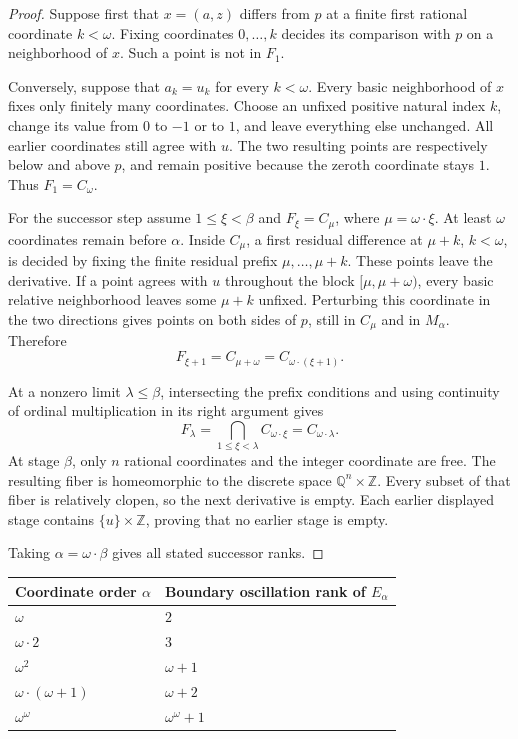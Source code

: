 \documentclass[11pt]{article}
\numberwithin{equation}{section}
\theoremstyle{definition}
\theoremstyle{remark}
\newcommand{\Z}{\mathbb Z}
\newcommand{\Q}{\mathbb Q}
\begin{document}
\begin{proof}
Suppose first that $x=(a,z)$ differs from $p$ at a finite first rational
coordinate $k<\omega$. Fixing coordinates $0,\ldots,k$ decides its
comparison with $p$ on a neighborhood of $x$. Such a point is not in
$F_1$.

Conversely, suppose that $a_k=u_k$ for every $k<\omega$. Every basic
neighborhood of $x$ fixes only finitely many coordinates. Choose an
unfixed positive natural index $k$, change its value from $0$ to $-1$
or to $1$, and leave everything else unchanged. All earlier coordinates
still agree with $u$. The two resulting points are respectively below and
above $p$, and remain positive because the zeroth coordinate stays $1$.
Thus $F_1=C_\omega$.

For the successor step assume $1\leq\xi<\beta$ and
$F_\xi=C_\mu$, where $\mu=\omega\cdot\xi$. At least $\omega$
coordinates remain before $\alpha$. Inside $C_\mu$, a first residual
difference at $\mu+k$, $k<\omega$, is decided by fixing the finite
residual prefix $\mu,\ldots,\mu+k$. These points leave the derivative.
If a point agrees with $u$ throughout the block
$[\mu,\mu+\omega)$, every basic relative neighborhood leaves some
$\mu+k$ unfixed. Perturbing this coordinate in the two directions gives
points on both sides of $p$, still in $C_\mu$ and in $M_\alpha$.
Therefore
\[
F_{\xi+1}=C_{\mu+\omega}=C_{\omega\cdot(\xi+1)}.
\]

At a nonzero limit $\lambda\leq\beta$, intersecting the prefix
conditions and using continuity of ordinal multiplication in its right
argument gives
\[
F_\lambda=\bigcap_{1\leq\xi<\lambda}C_{\omega\cdot\xi}
=C_{\omega\cdot\lambda}.
\]
At stage $\beta$, only $n$ rational coordinates and the integer coordinate
are free. The resulting fiber is homeomorphic to the discrete space
$\Q^n\times\Z$. Every subset of that fiber is relatively clopen, so
the next derivative is empty. Each earlier displayed stage contains
$\{u\}\times\Z$, proving that no earlier stage is empty.

Taking $\alpha=\omega\cdot\beta$ gives all stated successor ranks.
\end{proof}

\begin{center}
\begin{tabular}{ll}
\toprule
Coordinate order $\alpha$ & Boundary oscillation rank of $E_\alpha$\\
\midrule
$\omega$ & $2$\\
$\omega\cdot2$ & $3$\\
$\omega^2$ & $\omega+1$\\
$\omega\cdot(\omega+1)$ & $\omega+2$\\
$\omega^\omega$ & $\omega^\omega+1$\\
\bottomrule
\end{tabular}
\end{center}
\end{document}
